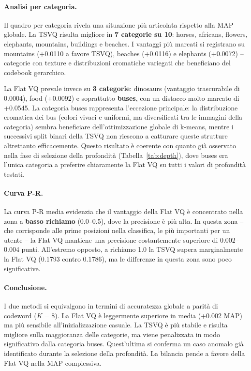 \documentclass[12pt, a4paper]{article}
\begin{document}
\paragraph{Analisi per categoria.}
Il quadro per categoria rivela una situazione più articolata rispetto alla MAP globale.
La TSVQ risulta migliore in \textbf{7 categorie su 10}: horses, africans, flowers,
elephants, mountains, buildings e beaches. I vantaggi più marcati si registrano su
mountains (+0.0110 a favore TSVQ), beaches (+0.0116) e elephants (+0.0072) -- categorie
con texture e distribuzioni cromatiche variegati che beneficiano del codebook gerarchico.

La Flat VQ prevale invece su \textbf{3 categorie}: dinosaurs (vantaggio trascurabile di
0.0004), food (+0.0092) e soprattutto \textbf{buses}, con un distacco molto marcato di
+0.0545. La categoria buses rappresenta l'eccezione principale: la distribuzione cromatica
dei bus (colori vivaci e uniformi, ma diversificati tra le immagini della categoria) sembra
beneficiare dell'ottimizzazione globale di k-means, mentre i successivi split binari della
TSVQ non riescono a catturare queste strutture altrettanto efficacemente. Questo risultato
è coerente con quanto già osservato nella fase di selezione della profondità
(Tabella~\ref{tab:depth}), dove buses era l'unica categoria a preferire chiaramente la
Flat VQ su tutti i valori di profondità testati.

\paragraph{Curva P-R.}
La curva P-R media evidenzia che il vantaggio della Flat VQ è concentrato nella zona a
\textbf{basso richiamo} (0.0--0.5), dove la precisione è più alta. In questa zona -- che
corrisponde alle prime posizioni nella classifica, le più importanti per un utente -- la
Flat VQ mantiene una precisione costantemente superiore di 0.002--0.004 punti. All'estremo
opposto, a richiamo 1.0 la TSVQ supera marginalmente la Flat VQ (0.1793 contro 0.1786),
ma le differenze in questa zona sono poco significative.

\paragraph{Conclusione.}
I due metodi si equivalgono in termini di accuratezza globale a parità di codeword ($K=8$).
La Flat VQ è leggermente superiore in media (+0.002 MAP) ma più sensibile all'inizializzazione
casuale. La TSVQ è più stabile e risulta migliore sulla maggioranza delle categorie,
ma viene penalizzata in modo significativo dalla categoria buses. Quest'ultima si conferma
un caso anomalo già identificato durante la selezione della profondità. La bilancia pende a favore della Flat VQ nella MAP complessiva.
\end{document}
